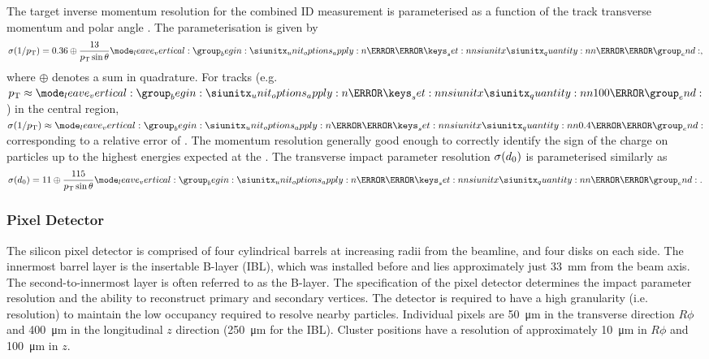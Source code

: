 The target inverse momentum resolution for the combined ID measurement is parameterised as a function of the track transverse momentum and polar angle \cite{ATLAS-TDR-14}.
The parameterisation is given by
%
\begin{equation}
  \sigma(1/\pt) = 0.36 \oplus \frac{13}{\pt \sin\theta} \SI{}{\per\TeV} ,
\end{equation}
%
where $\oplus$ denotes a sum in quadrature.
For \highpt tracks (e.g. $\pt \approx \SI{100}{\GeV}$) in the central region, $\sigma(1/\pt) \approx \SI{0.4}{\per\TeV}$ corresponding to a relative error of .
The momentum resolution generally good enough to correctly identify the sign of the charge on particles up to the highest energies expected at the \LHC.
The transverse impact parameter resolution $\sigma(d_{0})$ is parameterised similarly as
%
\begin{equation}
  \sigma(\dzero) = 11 \oplus \frac{115}{\pt \sin\theta} \SI{}{\micro\meter} .
\end{equation}
%

\subsubsection{Pixel Detector}
The silicon pixel detector is comprised of four cylindrical barrels at increasing radii from the beamline, and four disks on each side.
The innermost barrel layer is the insertable B-layer (IBL), which was installed before \runtwo \cite{ATLAS-TDR-19,PIX-2018-001} and lies approximately just \SI{33}{\milli\meter} from the beam axis.
The second-to-innermost layer is often referred to as the B-layer.
The specification of the pixel detector determines the impact parameter resolution and the ability to reconstruct primary and secondary vertices.
The detector is required to have a high granularity (i.e. resolution) to maintain the low occupancy required to resolve nearby particles. %
Individual pixels are \SI{50}{\micro\meter} in the transverse direction $R\phi$ and \SI{400}{\micro\meter} in the longitudinal $z$ direction (\SI{250}{\micro\meter} for the IBL).
Cluster positions have a resolution of approximately \SI{10}{\micro\meter} in $R\phi$ and \SI{100}{\micro\meter} in $z$.


